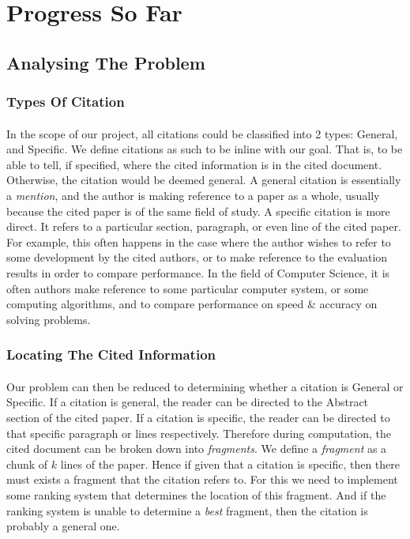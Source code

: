 \documentclass[12 pt]{article}
\begin{document}
\section{Progress So Far}
\subsection{Analysing The Problem}
\subsubsection{Types Of Citation}
\paragraph{}
In the scope of our project, all citations could be classified into 2 types: General, and Specific. We define citations as such to be inline with our goal. That is, to be able to tell, if specified, where the cited information is in the cited document. Otherwise, the citation would be deemed general. A general citation is essentially a \textit{mention}, and the author is making reference to a paper as a whole, usually because the cited paper is of the same field of study. A specific citation is more direct. It refers to a particular section, paragraph, or even line of the cited paper. For example, this often happens in the case where the author wishes to refer to some development by the cited authors, or to make reference to the evaluation results in order to compare performance. In the field of Computer Science, it is often authors make reference to some particular computer system, or some computing algorithms, and to compare performance on speed \& accuracy on solving problems.

\subsubsection{Locating The Cited Information}
\paragraph{}
Our problem can then be reduced to determining whether a citation is General or Specific. If a citation is general, the reader can be directed to the Abstract section of the cited paper. If a citation is specific, the reader can be directed to that specific paragraph or lines respectively. Therefore during computation, the cited document can be broken down into \textit{fragments}. We define a \textit{fragment} as a chunk of $k$ lines of the paper. Hence if given that a citation is specific, then there must exists a fragment that the citation refers to. For this we need to implement some ranking system that determines the location of this fragment. And if the ranking system is unable to determine a \textit{best} fragment, then the citation is probably a general one.
\end{document}
